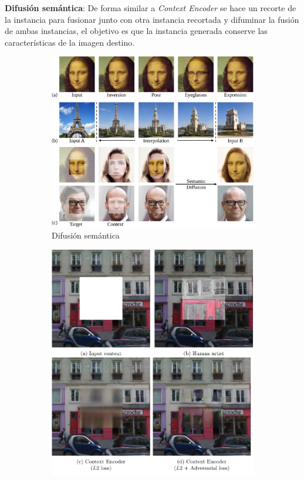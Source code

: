 \textbf{Difusión semántica}:
De forma similar a \textit{Context Encoder} se hace un recorte de la instancia para fusionar junto con otra instancia recortada y difuminar la fusión de ambas instancias, el objetivo es que la instancia generada conserve las características de la imagen destino.

\begin{figure}[H]
    \captionsetup[subfigure]{justification=centering}
    \begin{subfigure}{.65\linewidth}
        \includegraphics[width=\linewidth]{figures/chapter02/main_teaser.pdf}
        \caption{Difusión semántica}
        \label{subfig:semantic-diffusion}
    \end{subfigure} \hfill
    \begin{subfigure}{.35\linewidth}
        \includegraphics[width=\linewidth]{figures/chapter02/context-encoder.pdf}

\end{subfigure}
\end{figure}
